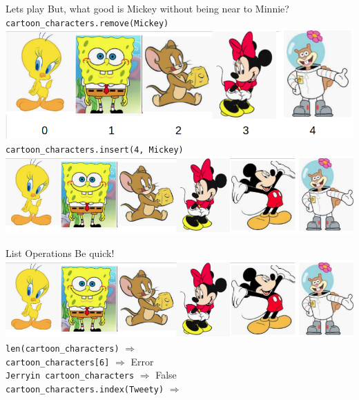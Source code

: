     \begin{frame} {Let\textquotesingle s play}
        But, what good is Mickey without being near to Minnie?\\
        \pause
        \texttt{cartoon\_characters.remove(\textquotesingle Mickey\textquotesingle )}\\
        \includegraphics[width=.77\textwidth]{images/list_cartoons/list_after_remove.png}   
        \pause
        \texttt{cartoon\_characters.insert(4, \textquotesingle Mickey\textquotesingle )}\\
        \pause
        \includegraphics[width=.89\textwidth]{images/list_cartoons/list_after_insert.png}       
    \end{frame}

    \begin{frame}{List Operations}
        Be quick!\\
        \includegraphics[width=\textwidth]{images/list_cartoons/list_after_insert.png}     
        \texttt{len(cartoon\_characters)}  $\Rightarrow$ \\
        \pause \texttt{cartoon\_characters[6]}  $\Rightarrow$ \pause Error\\
        \pause \texttt{\textquotesingle Jerry\textquotesingle  in cartoon\_characters}  $\Rightarrow$ \pause False\\
        \pause \texttt{cartoon\_characters.index(\textquotesingle Tweety\textquotesingle )}  $\Rightarrow$ \\
    \end{frame}

